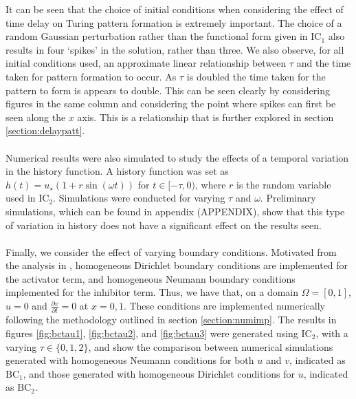 It can be seen that the choice of initial conditions when considering the effect of time delay on Turing pattern formation is extremely important. The choice of a random Gaussian perturbation rather than the functional form given in $\text{IC}_1$ also results in four `spikes' in the solution, rather than three. We also observe, for all initial conditions used, an approximate linear relationship between $\tau$ and the time taken for pattern formation to occur. As $\tau$ is doubled the time taken for the pattern to form is appears to double. This can be seen clearly by considering figures in the same column and considering the point where spikes can first be seen along the $x$ axis. This is a relationship that is further explored in section \ref{section:delaypatt}.
\\\\
Numerical results were also simulated to study the effects of a temporal variation in the history function. A history function was set as $h(t)=u_\star(1+r\sin(\omega t))$ for $t\in[-\tau,0)$, where $r$ is the random variable used in $\text{IC}_2$. Simulations were conducted for varying $\tau$ and $\omega$. Preliminary simulations, which can be found in appendix (APPENDIX), show that this type of variation in history does not have a significant effect on the results seen.
\\\\
Finally, we consider the effect of varying boundary conditions. Motivated from the analysis in \cite{krausemixed}, homogeneous Dirichlet boundary conditions are implemented for the activator term, and homogeneous Neumann boundary conditions implemented for the inhibitor term. Thus, we have that, on a domain $\Omega=[0,1]$, $u=0$ and $\frac{\partial v}{\partial t}=0$ at $x=0, 1$. These conditions are implemented numerically following the methodology outlined in section \ref{section:numimp}. The results in figures \ref{fig:bctau1}, \ref{fig:bctau2}, and \ref{fig:bctau3} were generated using $\text{IC}_2$, with a varying $\tau\in\{0,1,2\}$, and show the comparison between numerical simulations generated with homogeneous Neumann conditions for both $u$ and $v$, indicated as $\text{BC}_1$, and those generated with homogeneous Dirichlet conditions for $u$, indicated as $\text{BC}_2$.

